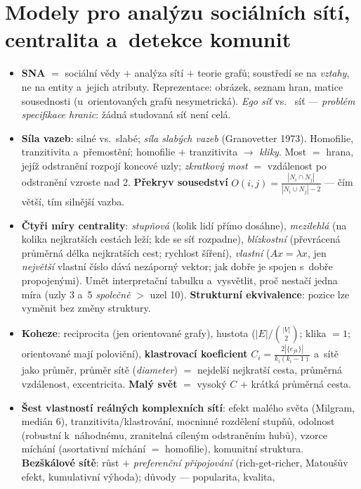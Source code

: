 \documentclass[11pt,a4paper]{article}
\theoremstyle{definition}
\begin{document}
\section{Modely pro analýzu sociálních sítí, centralita a~detekce komunit}
\begin{itemize}
\item \textbf{SNA} $=$ sociální vědy $+$ analýza sítí $+$ teorie grafů; soustředí se na
 \emph{vztahy}, ne na entity a~jejich atributy. Reprezentace: obrázek, seznam hran, matice
 sousednosti (u~orientovaných grafů nesymetrická). \emph{Ego síť} vs.\  síť ---
 \emph{problém specifikace hranic}: žádná studovaná síť není celá.
\item \textbf{Síla vazeb}: silné vs.\ slabé; \emph{síla slabých vazeb} (Granovetter 1973).
 Homofilie, tranzitivita a~přemostění; homofilie $+$ tranzitivita $\to$ \emph{kliky}.
 Most $=$ hrana, jejíž odstranění rozpojí koncové uzly; \emph{zkratkový most} $=$
 vzdálenost po odstranění vzroste nad 2. \textbf{Překryv sousedství}
 $O(i,j)=\frac{|N_i\cap N_j|}{|N_i\cup N_j|-2}$ --- čím větší, tím silnější vazba.
\item \textbf{Čtyři míry centrality}: \emph{stupňová} (kolik lidí přímo dosáhne),
 \emph{mezilehlá} (na kolika nejkratších cestách leží; kde se síť rozpadne),
 \emph{blízkostní} (převrácená průměrná délka nejkratších cest; rychlost šíření),
 \emph{vlastní} ($Ax=\lambda x$, jen \emph{největší} vlastní číslo dává nezáporný vektor;
 jak dobře je spojen s~dobře propojenými). Umět interpretační tabulku a~vysvětlit, proč
 nestačí jedna míra (uzly 3 a~5 \emph{společně} $>$ uzel 10). \textbf{Strukturní
 ekvivalence}: pozice lze vyměnit bez změny struktury.
\item \textbf{Koheze}: reciprocita (jen orientované grafy), hustota
 ($|E|/\binom{|V|}{2}$; klika $=1$; orientované mají poloviční), \textbf{klastrovací
 koeficient} $C_i=\frac{2|\{e_{jk}\}|}{k_i(k_i-1)}$ a~sítě jako průměr, průměr sítě
 (\emph{diameter}) $=$ nejdelší nejkratší cesta, průměrná vzdálenost, excentricita.
 \textbf{Malý svět} $=$ vysoký $C$ $+$ krátká průměrná cesta.
\item \textbf{Šest vlastností reálných komplexních sítí}: efekt malého světa (Milgram, medián
 6), tranzitivita/klastrování, mocninné rozdělení stupňů, odolnost (robustní k~náhodnému,
 zranitelná cíleným odstraněním hubů), vzorce míchání (asortativní míchání $=$ homofilie),
 komunitní struktura. \textbf{Bezškálové sítě}: růst $+$ \emph{preferenční připojování}
 (rich-get-richer, Matoušův efekt, kumulativní výhoda); důvody --- popularita, kvalita,

\end{itemize}
\end{document}
